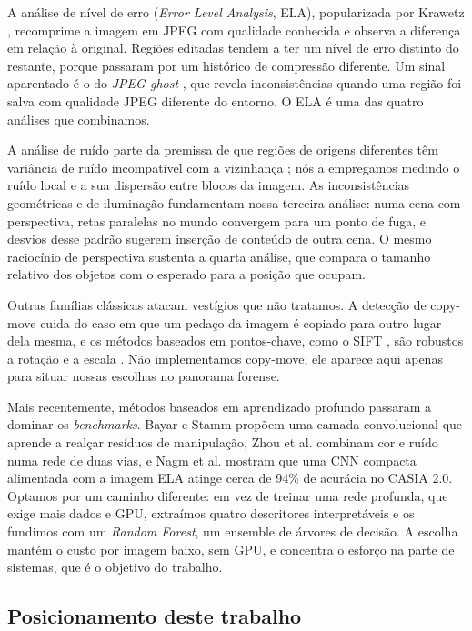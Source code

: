 \documentclass[12pt]{article}
\begin{document}
A análise de nível de erro (\textit{Error Level Analysis}, ELA), popularizada por
Krawetz \cite{krawetz2007}, recomprime a imagem em JPEG com qualidade conhecida e
observa a diferença em relação à original. Regiões editadas tendem a ter um nível
de erro distinto do restante, porque passaram por um histórico de compressão
diferente. Um sinal aparentado é o do \textit{JPEG ghost} \cite{farid2009}, que
revela inconsistências quando uma região foi salva com qualidade JPEG diferente
do entorno. O ELA é uma das quatro análises que combinamos.

A análise de ruído parte da premissa de que regiões de origens diferentes têm
variância de ruído incompatível com a vizinhança \cite{mahdian2009}; nós a
empregamos medindo o ruído local e a sua dispersão entre blocos da imagem. As
inconsistências geométricas e de iluminação \cite{farid2009} fundamentam nossa
terceira análise: numa cena com perspectiva, retas paralelas no mundo convergem
para um ponto de fuga, e desvios desse padrão sugerem inserção de conteúdo de
outra cena. O mesmo raciocínio de perspectiva sustenta a quarta análise, que
compara o tamanho relativo dos objetos com o esperado para a posição que ocupam.

Outras famílias clássicas atacam vestígios que não tratamos. A detecção de
copy-move cuida do caso em que um pedaço da imagem é copiado para outro lugar
dela mesma, e os métodos baseados em pontos-chave, como o SIFT \cite{lowe2004},
são robustos a rotação e a escala \cite{christlein2012}. Não implementamos
copy-move; ele aparece aqui apenas para situar nossas escolhas no panorama
forense.

Mais recentemente, métodos baseados em aprendizado profundo passaram a dominar os
\textit{benchmarks}. Bayar e Stamm \cite{bayar2016} propõem uma camada
convolucional que aprende a realçar resíduos de manipulação, Zhou et al.
\cite{zhou2018} combinam cor e ruído numa rede de duas vias, e Nagm et al.
\cite{nagm2024} mostram que uma CNN compacta alimentada com a imagem ELA atinge
cerca de 94\% de acurácia no CASIA 2.0. Optamos por um caminho diferente: em vez
de treinar uma rede profunda, que exige mais dados e GPU, extraímos quatro
descritores interpretáveis e os fundimos com um \textit{Random Forest}, um
ensemble de árvores de decisão. A escolha mantém o custo por imagem baixo, sem
GPU, e concentra o esforço na parte de sistemas, que é o objetivo do trabalho.

\subsection{Posicionamento deste trabalho}
\end{document}
